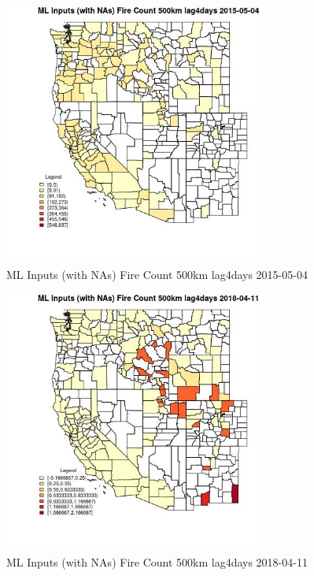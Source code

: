 \begin{figure} 
\centering  
\includegraphics[width=0.77\textwidth]{Code_Outputs/Report_ML_input_PM25_Step4_part_e_de_duplicated_aves_compiled_2019-05-18wNAs_CountyFire_Count_500km_lag4daysMean2015-05-04.jpg} 
\caption{\label{fig:Report_ML_input_PM25_Step4_part_e_de_duplicated_aves_compiled_2019-05-18wNAsCountyFire_Count_500km_lag4daysMean2015-05-04}ML Inputs (with NAs) Fire Count 500km lag4days 2015-05-04} 
\end{figure} 
 

\begin{figure} 
\centering  
\includegraphics[width=0.77\textwidth]{Code_Outputs/Report_ML_input_PM25_Step4_part_e_de_duplicated_aves_compiled_2019-05-18wNAs_CountyFire_Count_500km_lag4daysMean2018-04-11.jpg} 
\caption{\label{fig:Report_ML_input_PM25_Step4_part_e_de_duplicated_aves_compiled_2019-05-18wNAsCountyFire_Count_500km_lag4daysMean2018-04-11}ML Inputs (with NAs) Fire Count 500km lag4days 2018-04-11} 
\end{figure} 
 

